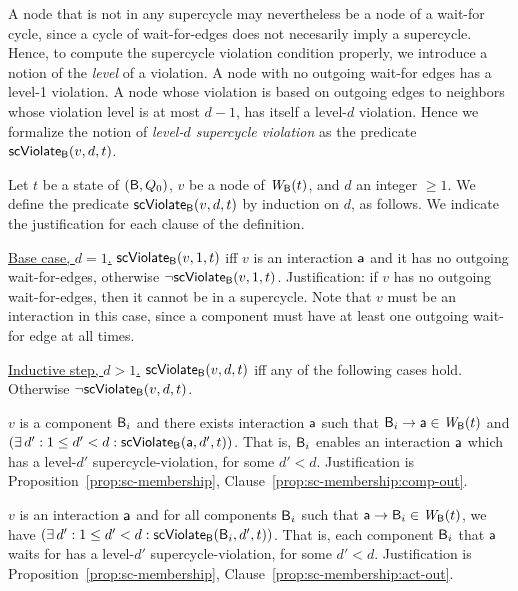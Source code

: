 A node that is not in any supercycle may nevertheless be a node of a wait-for cycle, since a cycle
of wait-for-edges does not necesarily imply a supercycle. Hence, to compute the supercycle violation
condition properly, we introduce a notion of the \emph{level} of a violation. A node with no
outgoing wait-for edges has a level-1 violation. A node whose violation is based on outgoing edges
to neighbors whose violation level is at most $d-1$, has itself a level-$d$ violation.  Hence we
formalize the notion of \emph{level-$d$ supercycle violation} as the predicate $\mathsf{scViolate}_{\mathsf{B}}(v,d,t)$.


\label{def:supercycle-violation}
\label{def:supercycle.violation}
Let $t$ be a state of $(\mathsf{B}, Q_0)$, $v$ be a node of $\mathit{W}_{\mathsf{B}}({t})$, and $d$ an integer $\ge 1$.
We define the predicate $\mathsf{scViolate}_{\mathsf{B}}(v,d,t)$ by induction on $d$, as follows. We indicate the
justification for each clause of the definition.

\noindent
\ul{Base case, $d=1$.} $\mathsf{scViolate}_{\mathsf{B}}(v,1,t)$ iff $v$ is an interaction $\mathsf{a}$ and it has no outgoing wait-for-edges, otherwise $\neg \mathsf{scViolate}_{\mathsf{B}}(v,1,t)$.
%
Justification: if $v$ has no outgoing wait-for-edges, then it cannot be in a supercycle.  Note that $v$ must be an
interaction in this case, since a component must have at least one outgoing wait-for edge at all times.

\noindent
\ul{Inductive step, $d > 1$.}  $\mathsf{scViolate}_{\mathsf{B}}(v,d,t)$ iff any of the following cases hold. Otherwise $\neg \mathsf{scViolate}_{\mathsf{B}}(v,d,t)$.

\bn

\item  \label{def:supercycle.violation.component.out}
$v$ is a component $\mathsf{B}_i$ and there exists interaction $\mathsf{a}$ such that $\mathsf{B}_i \rightarrow \mathsf{a} \in \mathit{W}_{\mathsf{B}}({t})$ and $(\exists\, d' : 1 \le d' < d: \mathsf{scViolate}_{\mathsf{B}}(\mathsf{a},d',t))$.
That is, $\mathsf{B}_i$ enables an interaction $\mathsf{a}$ which has a level-$d'$ supercycle-violation, for some $d' < d$.
Justification is Proposition~\ref{prop:sc-membership}, Clause~\ref{prop:sc-membership:comp-out}.


\item \label{def:supercycle.violation.interaction.out}
$v$ is an interaction $\mathsf{a}$ and for all components $\mathsf{B}_i$ such that $\mathsf{a} \rightarrow \mathsf{B}_i \in \mathit{W}_{\mathsf{B}}({t})$, we have $(\exists\, d' : 1 \le d' < d: \mathsf{scViolate}_{\mathsf{B}}(\mathsf{B}_i,d',t))$.
That is, each component $\mathsf{B}_i$ that $\mathsf{a}$ waits for has a level-$d'$ supercycle-violation, for some $d' < d$.
Justification is Proposition~\ref{prop:sc-membership}, Clause~\ref{prop:sc-membership:act-out}.

